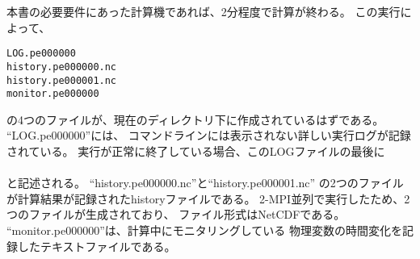 本書の必要要件にあった計算機であれば、2分程度で計算が終わる。
\noindent この実行によって、\\
\begin{alltt}
  LOG.pe000000
  history.pe000000.nc
  history.pe000001.nc
  monitor.pe000000
\end{alltt}
の4つのファイルが、現在のディレクトリ下に作成されているはずである。
``LOG.pe000000''には、
コマンドラインには表示されない詳しい実行ログが記録されている。
実行が正常に終了している場合、このLOGファイルの最後に\\

\\

\noindent と記述される。
``history.pe000000.nc''と``history.pe000001.nc''
の2つのファイルが計算結果が記録されたhistoryファイルである。
2-MPI並列で実行したため、2つのファイルが生成されており、
ファイル形式はNetCDFである。
``monitor.pe000000''は、計算中にモニタリングしている
物理変数の時間変化を記録したテキストファイルである。

